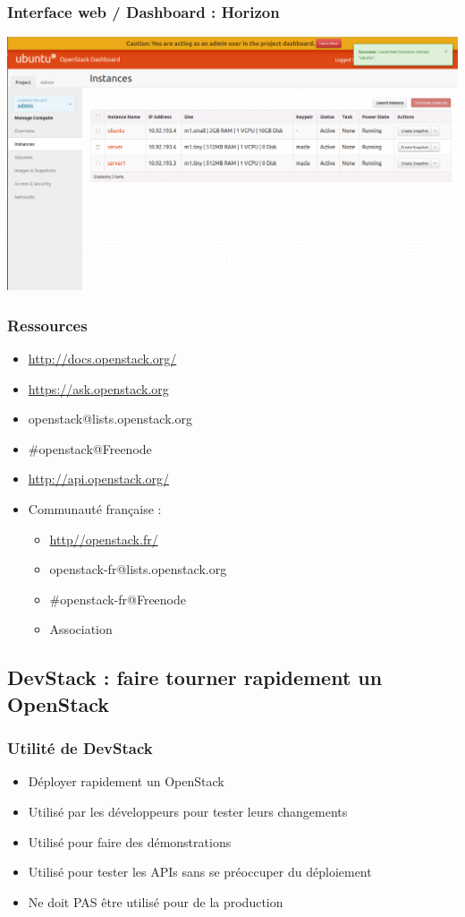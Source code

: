   \begin{frame}
    \frametitle{Interface web / Dashboard : Horizon}
    \includegraphics[width=\textwidth]{images/horizon.png}
  \end{frame}

  \begin{frame}
    \frametitle{Ressources}
    \begin{itemize}
      \item \url{http://docs.openstack.org/}
      \item \url{https://ask.openstack.org}
      \item openstack@lists.openstack.org
      \item \#openstack@Freenode
      \item \url{http://api.openstack.org/}
      \item Communauté française :
      \begin{itemize}
        \item \url{http//openstack.fr/}
        \item openstack-fr@lists.openstack.org
        \item \#openstack-fr@Freenode
		\item Association
      \end{itemize}
    \end{itemize}
  \end{frame}

  \subsection[DevStack]{DevStack : faire tourner rapidement un OpenStack}

  \begin{frame}
    \frametitle{Utilité de DevStack}
    \begin{itemize}
      \item Déployer rapidement un OpenStack
      \item Utilisé par les développeurs pour tester leurs changements
      \item Utilisé pour faire des démonstrations
      \item Utilisé pour tester les APIs sans se préoccuper du déploiement
      \item Ne doit PAS être utilisé pour de la production
    \end{itemize}
  \end{frame}

